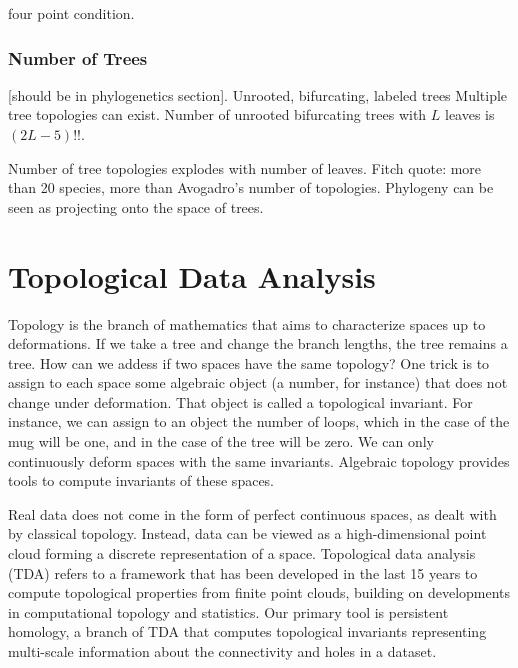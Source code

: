 four point condition.

\subsubsection{Number of Trees}

[should be in phylogenetics section].
Unrooted, bifurcating, labeled trees
Multiple tree topologies can exist.
Number of unrooted bifurcating trees with $L$ leaves is $(2L-5)!!$.

Number of tree topologies explodes with number of leaves.
Fitch quote: more than 20 species, more than Avogadro's number of topologies.
Phylogeny can be seen as projecting onto the space of trees.




\section{Topological Data Analysis}

Topology is the branch of mathematics that aims to characterize spaces up to deformations.
If we take a tree and change the branch lengths, the tree remains a tree.
How can we addess if two spaces have the same topology?
One trick is to assign to each space some algebraic object (a number, for instance) that does not change under deformation.
That object is called a topological invariant.
For instance, we can assign to an object the number of loops, which in the case of the mug will be one, and in the case of the tree will be zero.
We can only continuously deform spaces with the same invariants.
Algebraic topology provides tools to compute invariants of these spaces.

Real data does not come in the form of perfect continuous spaces, as dealt with by classical topology.
Instead, data can be viewed as a high-dimensional point cloud forming a discrete representation of a space.
Topological data analysis (TDA) refers to a framework that has been developed in the last 15 years to compute topological properties from finite point clouds, building on developments in computational topology and statistics.
Our primary tool is persistent homology, a branch of TDA that computes topological invariants representing multi-scale information about the connectivity and holes in a dataset.

